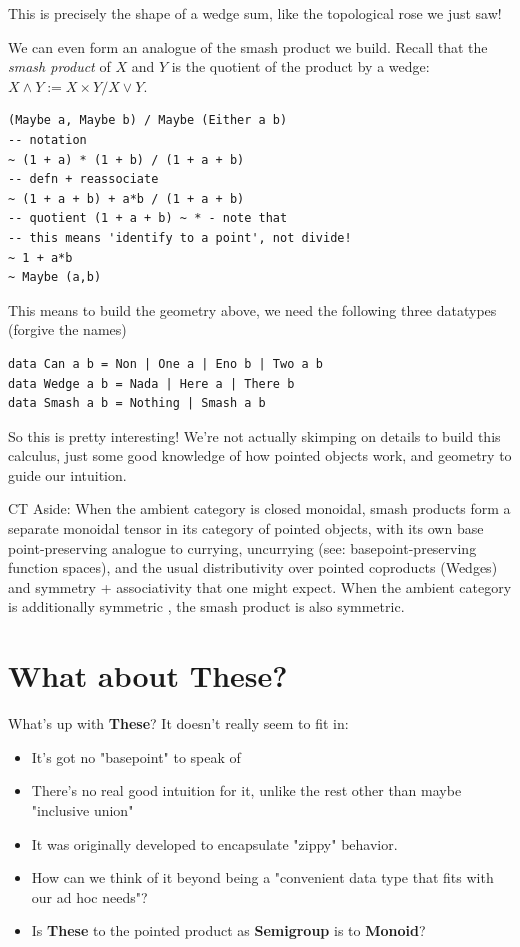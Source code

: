 \documentclass[tikz]{beamer}
\theoremstyle{definition}
\begin{document}
\frame
{
	This is precisely the shape of a wedge sum, like the topological rose we just saw!
}

\frame
{
	We can even form an analogue of the smash product we build. Recall that the \textit{smash product} of $X$ and $Y$ is the quotient of the product by a wedge: $X \wedge Y := X \times Y / X \vee Y$.
}

\begin{frame}[fragile]
\begin{verbatim}
(Maybe a, Maybe b) / Maybe (Either a b)
-- notation
~ (1 + a) * (1 + b) / (1 + a + b)
-- defn + reassociate
~ (1 + a + b) + a*b / (1 + a + b)
-- quotient (1 + a + b) ~ * - note that
-- this means 'identify to a point', not divide!
~ 1 + a*b
~ Maybe (a,b)
\end{verbatim}
\end{frame}

\frame
{
	This means to build the geometry above, we need the following three datatypes (forgive the names)
}
\begin{frame}[fragile]
\begin{verbatim}
data Can a b = Non | One a | Eno b | Two a b
data Wedge a b = Nada | Here a | There b
data Smash a b = Nothing | Smash a b
\end{verbatim}
\end{frame}

\frame
{
	So this is pretty interesting! We're not actually skimping on details to build this calculus, just some good knowledge of how pointed objects work, and geometry to guide our intuition.
}

\frame
{
	CT Aside: When the ambient category is closed monoidal, smash products form a separate monoidal tensor in its category of pointed objects, with its own base point-preserving analogue to currying, uncurrying (see: basepoint-preserving function spaces), and the usual distributivity over pointed coproducts (Wedges) and symmetry + associativity that one might expect. When the ambient category is additionally symmetric , the smash product is also symmetric.
	  
}


\section{What about These?}

\frame
{
	What's up with \textbf{These}? It doesn't really seem to fit in: 
	
	\begin{itemize}
		\item It's got no "basepoint" to speak of
		\item There's no real good intuition for it, unlike the rest other than maybe "inclusive union"
		\item It was originally developed to encapsulate "zippy" behavior.
		\item How can we think of it beyond being a "convenient data type that fits with our ad hoc needs"?
		\item Is \textbf{These} to the pointed product as \textbf{Semigroup} is to \textbf{Monoid}?
	\end{itemize}
}
\end{document}
